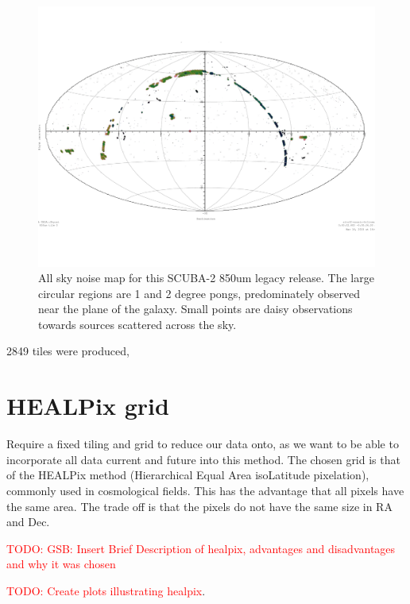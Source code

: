 \documentclass[usenatbib]{mn2e}
\newcommand{\todo}[1]{\textcolor{red}{TODO: #1}}
\begin{document}
\begin{figure}
  \centering
  \includegraphics[width=0.9\linewidth]{legacy850-noise-aitoff}
  \caption{All sky noise map for this SCUBA-2 850um legacy
    release. The large circular regions are 1 and 2 degree pongs,
    predominately observed near the plane of the galaxy. Small points
    are daisy observations towards sources scattered across the
    sky.}
  \label{fig:noise-aitoff}
\end{figure}

2849 tiles were produced,







\section{HEALPix grid }
Require a fixed tiling and grid to reduce our data onto, as we want to
be able to incorporate all data current and future into this
method. The chosen grid is that of the HEALPix method (Hierarchical
Equal Area isoLatitude pixelation), commonly used in cosmological
fields. This has the advantage that all pixels have the same area. The
trade off is that the pixels do not have the same size in RA and Dec.

\todo{GSB: Insert Brief Description of healpix, advantages and
  disadvantages and why it was chosen }

\todo{Create plots illustrating healpix}.
\end{document}
